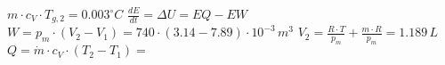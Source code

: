 \( m \cdot c_V \cdot T_{g,2} = 0.003^\circ C \)  
\( \frac{dE}{dt} = \Delta U = EQ - EW \)  
\( W = p_m \cdot (V_2 - V_1) = 740 \cdot (3.14 - 7.89) \cdot 10^{-3} \, m^3 \)  
\( V_2 = \frac{R \cdot T}{p_m} + \frac{m \cdot R}{p_m} = 1.189 \, L \)  
\( Q = \dot{m} \cdot c_V \cdot (T_2 - T_1) = \)